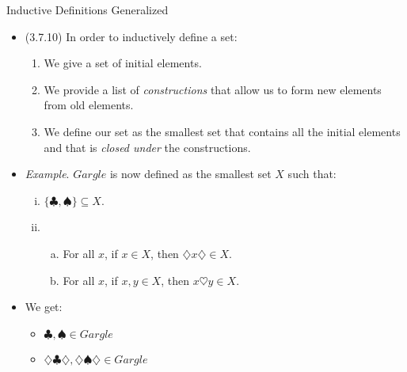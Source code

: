 \begin{frame}{Inductive Definitions Generalized}

	\begin{itemize}
	
		\item (3.7.10) In order to inductively define a set:
		
		\begin{enumerate}[1.]
	
		\item We give a set of initial elements.
		
		\item We provide a list of \emph{constructions} that allow us to form new elements from old elements.
		
		\item We define our set as the smallest set that contains all the initial elements and that is \emph{closed under} the constructions.
	
	\end{enumerate} 
	
		\item \emph{Example}. $Gargle$ is now defined as the smallest set $X$ such that:
			
			\begin{enumerate}[(i)]
			
				\item $\{\clubsuit,\spadesuit\}\subseteq X$.
			
				\item \begin{enumerate}[(a)]
				
					\item For all $x$, if $x\in X$, then $\diamondsuit x\diamondsuit\in X$.
			
					\item For all $x$, if $x,y\in X$, then $ x\heartsuit y\in X$.
				
				\end{enumerate}
				
			\end{enumerate}
			
		\item We get:
		
		\begin{itemize}
				
					\item $\clubsuit,\spadesuit\in Gargle$
					
					\item $\diamondsuit\clubsuit\diamondsuit,\diamondsuit\spadesuit\diamondsuit\in Gargle$
					

\end{itemize}
\end{itemize}
\end{frame}
